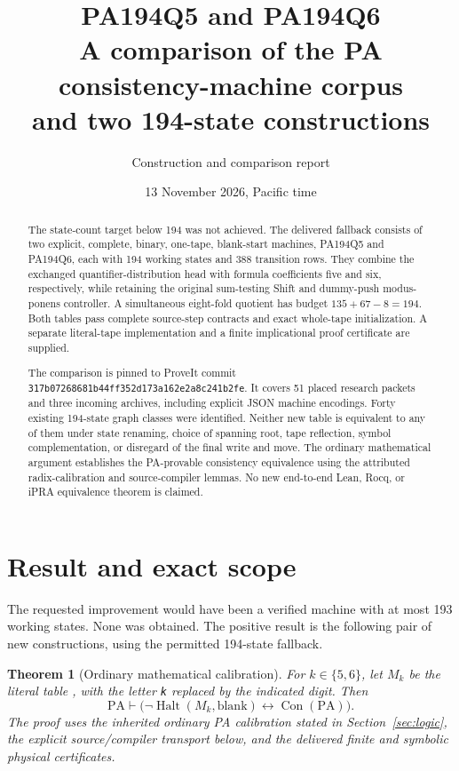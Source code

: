 \documentclass[11pt,letterpaper]{article}
\title{\textbf{PA194Q5 and PA194Q6}\\[4pt]
\large A comparison of the PA consistency-machine corpus\\
and two 194-state constructions}
\author{Construction and comparison report}
\date{13 November 2026, Pacific time}
\newcommand{\PA}{\mathrm{PA}}
\newcommand{\Con}{\operatorname{Con}}
\newcommand{\Halt}{\operatorname{Halt}}
\newcommand{\file}[1]{\texttt{\path{#1}}}
\newtheorem{theorem}{Theorem}
\begin{document}
\maketitle
\begin{abstract}
The state-count target below 194 was not achieved. The delivered fallback
consists of two explicit, complete, binary, one-tape, blank-start machines,
PA194Q5 and PA194Q6, each with 194 working states and 388 transition rows.
They combine the exchanged quantifier-distribution head with formula
coefficients five and six, respectively, while retaining the original
sum-testing Shift and dummy-push modus-ponens controller. A simultaneous
eight-fold quotient has budget $135+67-8=194$. Both tables pass complete
source-step contracts and exact whole-tape initialization. A separate
literal-tape implementation and a finite implicational proof certificate
are supplied.

The comparison is pinned to ProveIt commit
\nolinkurl{317b07268681b44ff352d173a162e2a8c241b2fe}. It covers 51 placed
research packets and three incoming archives, including explicit JSON
machine encodings. Forty existing 194-state graph classes were identified.
Neither new table is equivalent to any of them under state renaming,
choice of spanning root, tape reflection, symbol complementation, or
disregard of the final write and move. The ordinary mathematical argument
establishes the PA-provable consistency equivalence using the attributed
radix-calibration and source-compiler lemmas. No new end-to-end Lean, Rocq,
or iPRA equivalence theorem is claimed.
\end{abstract}

\section{Result and exact scope}

The requested improvement would have been a verified machine with at most
193 working states. None was obtained. The positive result is the following
pair of new constructions, using the permitted 194-state fallback.

\begin{theorem}[Ordinary mathematical calibration]
For $k\in\{5,6\}$, let $M_k$ be the literal table
\file{machines/PA194Qk/machine.tm}, with the letter \texttt{k} replaced by
the indicated digit. Then
\[
 \PA\vdash\bigl(\neg\Halt(M_k,\text{blank})\leftrightarrow\Con(\PA)\bigr).
\]
The proof uses the inherited ordinary PA calibration stated in
Section~\ref{sec:logic}, the explicit source/compiler transport below, and
the delivered finite and symbolic physical certificates.
\end{theorem}
\end{document}
